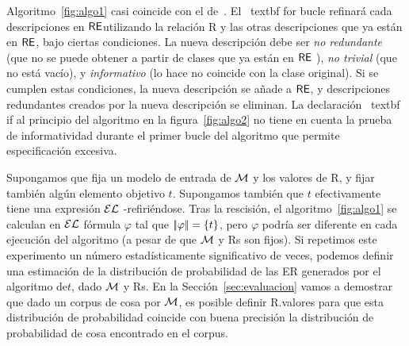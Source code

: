 Algoritmo~\ref{fig:algo1} casi coincide con el de~\cite{arec2:2008:Areces}. El \ textbf {for} bucle refinar\'a cada descripciones en $\textsf{RE}$utilizando la relaci\'on R y las otras descripciones que ya est\'an en $\textsf{RE} $, bajo ciertas condiciones. La nueva descripci\'on debe ser \emph{no redundante} (que no se puede obtener a partir de clases que ya est\'an en $\textsf{RE}$ ), \emph{no trivial} (que no est\'a vac\'{i}o), y \emph{informativo} (lo hace no coincide con la clase original). Si se cumplen estas condiciones, la nueva descripci\'on se a\~nade a $\textsf{RE} $, y descripciones redundantes creados por la nueva descripci\'on se eliminan. La declaraci\'on \ textbf {if} al principio del algoritmo en la figura~\ref{fig:algo2} no tiene en cuenta la prueba de informatividad durante el primer bucle del algoritmo que permite especificaci\'on excesiva.

Supongamos que fija un modelo de entrada de $\mathcal{M}$ y los valores de R, y fijar tambi\'en alg\'un elemento objetivo $t$. Supongamos tambi\'en que $t$ efectivamente tiene una expresi\'on $\mathcal{EL}$ -refiri\'endose. Tras la rescisi\'on, el algoritmo~\ref{fig:algo1} se calculan en $\mathcal{EL}$ f\'ormula $\varphi$ tal que $|\!|\varphi|\!| = \{t\}$, pero $\varphi$ podr\'{i}a ser diferente en cada ejecuci\'on del algoritmo (a pesar de que $\mathcal{M}$ y Rs son fijos). Si repetimos este experimento un n\'umero estad\'{i}sticamente significativo de veces, podemos definir una estimaci\'on de la distribuci\'on de probabilidad de las ER generados por el algoritmo de$t $, dado $\mathcal{M}$ y Rs. En la Secci\'on~\ref{sec:evaluacion} vamos a demostrar que dado un corpus de cosa por $\mathcal{M}$, es posible definir R.\puse valores para que esta distribuci\'on de probabilidad coincide con buena precisi\'on la distribuci\'on de probabilidad de cosa encontrado en el corpus.



